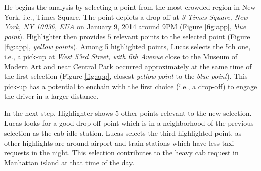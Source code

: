 He begins the analysis by selecting a point from the most crowded region in New York, i.e., Times Square. The point depicts a drop-off at {\em 3 Times Square, New York, NY 10036, EUA} on January 9, 2014 around 9PM (Figure \ref{fig:app}, \textit{blue point}). {\sc Highlighter} then provides $5$ relevant points to the selected point (Figure \ref{fig:app}, \textit{yellow points}).
Among 5 highlighted points, Lucas selects the 5th one, i.e., a pick-up at {\em West 53rd Street, with 6th Avenue} close to the Museum of Modern Art and near Central Park occurred approximately at the same time of the first selection (Figure \ref{fig:app}, closest \textit{yellow point} to the \textit{blue point}). This pick-up has a potential to enchain with the first choice (i.e., a drop-off) to engage the driver in a larger distance.

In the next step, {\sc Highlighter} shows 5 other points relevant to the new selection. Lucas looks for a good drop-off point which is in a neighborhood of the previous selection as the cab-idle station. Lucas selects the third highlighted point, as other highlights are around airport and train stations which have less taxi requests in the night. This selection contributes to the heavy cab request in Manhattan island at that time of the day. 

